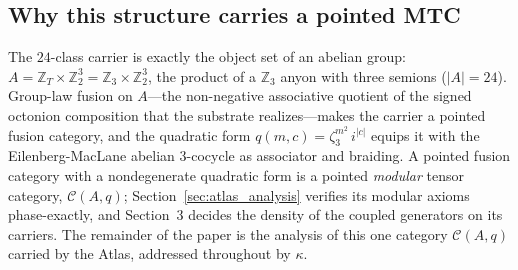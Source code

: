\subsection{Why this structure carries a pointed MTC}
The $24$-class carrier is exactly the object set of an abelian group: $A = \mathbb{Z}_{T} \times \mathbb{Z}_2^{3} = \mathbb{Z}_3 \times \mathbb{Z}_2^{3}$, the product of a $\mathbb{Z}_3$ anyon with three semions ($|A| = 24$). Group-law fusion on $A$---the non-negative associative quotient of the signed octonion composition that the substrate realizes---makes the carrier a pointed fusion category, and the quadratic form $q(m, c) = \zeta_3^{m^2}\, i^{|c|}$ equips it with the Eilenberg-MacLane abelian $3$-cocycle as associator and braiding. A pointed fusion category with a nondegenerate quadratic form is a pointed \emph{modular} tensor category, $\mathcal{C}(A, q)$; Section~\ref{sec:atlas_analysis} verifies its modular axioms phase-exactly, and Section~3 decides the density of the coupled generators on its carriers. The remainder of the paper is the analysis of this one category $\mathcal{C}(A, q)$ carried by the Atlas, addressed throughout by $\kappa$.
